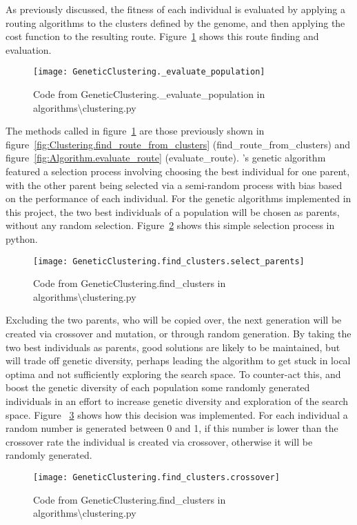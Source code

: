 \noindent
As previously discussed, the fitness of each individual is evaluated by applying a routing algorithms to the
clusters defined by the genome, and then applying the cost function to the resulting route.
Figure~\ref{fig:GeneticClustering._evaluate_population} shows this route finding and evaluation.
\begin{figure}[H]
    \centering
    \texttt{[image: GeneticClustering.\_evaluate\_population]}
    \caption{Code from GeneticClustering.\_evaluate\_population in algorithms\textbackslash clustering.py}
    \label{fig:GeneticClustering._evaluate_population}
\end{figure}

\noindent
The methods called in figure~\ref{fig:GeneticClustering._evaluate_population} are those previously shown in
figure~\ref{fig:Clustering.find_route_from_clusters} (find\_route\_from\_clusters) and
figure~\ref{fig:Algorithm.evaluate_route} (evaluate\_route).
\textcite{tang2000multiple}'s genetic algorithm featured a selection process involving choosing the best individual for
one parent, with the other parent being selected via a semi-random process with bias based on the performance of each
individual.
For the genetic algorithms implemented in this project, the two best individuals of a population will be chosen as
parents, without any random selection.
Figure~\ref{fig:GeneticClustering.find_clusters.select_parents} shows this simple selection process in python.
\begin{figure}[H]
    \centering
    \texttt{[image: GeneticClustering.find\_clusters.select\_parents]}
    \caption{Code from GeneticClustering.find\_clusters in algorithms\textbackslash clustering.py}
    \label{fig:GeneticClustering.find_clusters.select_parents}
\end{figure}

\noindent
Excluding the two parents, who will be copied over, the next generation will be created via crossover and mutation,
or through random generation.
By taking the two best individuals as parents, good solutions are likely to be maintained, but will trade off genetic
diversity, perhaps leading the algorithm to get stuck in local optima and not sufficiently exploring the search space.
To counter-act this, and boost the genetic diversity of each population some randomly generated individuals in an effort
to increase genetic diversity and exploration of the search space.
Figure ~\ref{fig:GeneticClustering.find_clusters.crossover} shows how this decision was implemented.
For each individual a random number is generated between 0 and 1, if this number is lower than the crossover rate
the individual is created via crossover, otherwise it will be randomly generated.
\begin{figure}[H]
    \centering
    \texttt{[image: GeneticClustering.find\_clusters.crossover]}
    \caption{Code from GeneticClustering.find\_clusters in algorithms\textbackslash clustering.py}
    \label{fig:GeneticClustering.find_clusters.crossover}
\end{figure}

